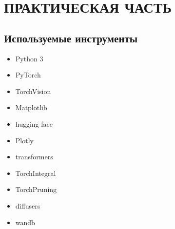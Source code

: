 \section{ПРАКТИЧЕСКАЯ ЧАСТЬ}
\vspace{-1.3cm}

\subsection{Используемые инструменты}

\begin{multicols}{3}
\begin{itemize}
 \item Python 3


 \item PyTorch


 \item TorchVision


 \item Matplotlib


 \item hugging-face


 \item Plotly


 \item transformers


 \item TorchIntegral


\item TorchPruning

\item diffusers

\item wandb
\end{itemize}
\end{multicols}


